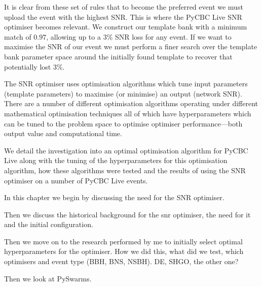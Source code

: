 It is clear from these set of rules that to become the preferred event we must upload the event with the highest SNR. This is where the PyCBC Live SNR optimiser becomes relevant. We construct our template bank with a minimum match of $0.97$, allowing up to a $3\%$ SNR loss for any event. If we want to maximise the SNR of our event we must perform a finer search over the template bank parameter space around the initially found template to recover that potentially lost $3\%$.

The SNR optimiser uses optimisation algorithms which tune input parameters (template parameters) to maximise (or minimise) an output (network SNR). There are a number of different optimisation algorithms operating under different mathematical optimisation techniques all of which have hyperparameters which can be tuned to the problem space to optimise optimiser performance---both output value and computational time.

We detail the investigation into an optimal optimisation algorithm for PyCBC Live along with the tuning of the hyperparameters for this optimisation algorithm, how these algorithms were tested and the results of using the SNR optimiser on a number of PyCBC Live events.





In this chapter we begin by discussing the need for the SNR optimiser.

Then we discuss the historical background for the snr optimiser, the need for it and the initial configuration.

Then we move on to the research performed by me to initially select optimal hyperparameters for the optimiser. How we did this, what did we test, which optimisers and event type (BBH, BNS, NSBH). DE, SHGO, the other one?

Then we look at PySwarms.

